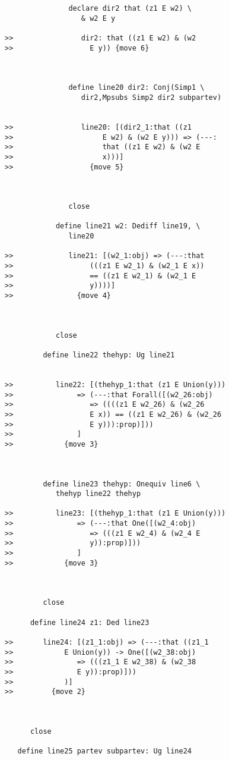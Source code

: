 \documentclass[12pt]{article}
\begin{document}
\begin{verbatim}
               declare dir2 that (z1 E w2) \
                  & w2 E y

>>                dir2: that ((z1 E w2) & (w2
>>                  E y)) {move 6}



               define line20 dir2: Conj(Simp1 \
                  dir2,Mpsubs Simp2 dir2 subpartev)


>>                line20: [(dir2_1:that ((z1
>>                     E w2) & (w2 E y))) => (---:
>>                     that ((z1 E w2) & (w2 E
>>                     x)))]
>>                  {move 5}



               close

            define line21 w2: Dediff line19, \
               line20

>>             line21: [(w2_1:obj) => (---:that
>>                  (((z1 E w2_1) & (w2_1 E x))
>>                  == ((z1 E w2_1) & (w2_1 E
>>                  y))))]
>>               {move 4}



            close

         define line22 thehyp: Ug line21


>>          line22: [(thehyp_1:that (z1 E Union(y)))
>>               => (---:that Forall([(w2_26:obj)
>>                  => ((((z1 E w2_26) & (w2_26
>>                  E x)) == ((z1 E w2_26) & (w2_26
>>                  E y))):prop)]))
>>               ]
>>            {move 3}



         define line23 thehyp: Onequiv line6 \
            thehyp line22 thehyp

>>          line23: [(thehyp_1:that (z1 E Union(y)))
>>               => (---:that One([(w2_4:obj)
>>                  => (((z1 E w2_4) & (w2_4 E
>>                  y)):prop)]))
>>               ]
>>            {move 3}



         close

      define line24 z1: Ded line23

>>       line24: [(z1_1:obj) => (---:that ((z1_1
>>            E Union(y)) -> One([(w2_38:obj)
>>               => (((z1_1 E w2_38) & (w2_38
>>               E y)):prop)]))
>>            )]
>>         {move 2}



      close

   define line25 partev subpartev: Ug line24



\end{verbatim}
\end{document}
